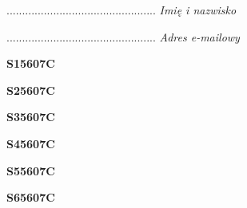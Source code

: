 \begin{turn}{90}\begin{minipage}{\linewidth} \vspace{20mm} ................................................  \textit{Imię i nazwisko}\end{minipage}\end{turn}

\begin{turn}{90}\begin{minipage}{\linewidth} \vspace{20mm} ................................................  \textit{Adres e-mailowy}\end{minipage}\end{turn}

\begin{turn}{90}\huge \begin{minipage}{\linewidth} \vspace{10mm}\textbf{S15607C}\end{minipage}\end{turn}

\begin{turn}{90}\huge \begin{minipage}{\linewidth} \vspace{10mm}\textbf{S25607C}\end{minipage}\end{turn}

\begin{turn}{90}\huge \begin{minipage}{\linewidth} \vspace{10mm}\textbf{S35607C}\end{minipage}\end{turn}

\begin{turn}{90}\huge \begin{minipage}{\linewidth} \vspace{10mm}\textbf{S45607C}\end{minipage}\end{turn}

\begin{turn}{90}\huge \begin{minipage}{\linewidth} \vspace{10mm}\textbf{S55607C}\end{minipage}\end{turn}

\begin{turn}{90}\huge \begin{minipage}{\linewidth} \vspace{10mm}\textbf{S65607C}\end{minipage}\end{turn}

